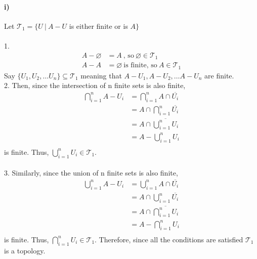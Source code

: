 \documentclass[11pt]{article}
\begin{document}
\paragraph{i)} Let $\mathcal{T}_1 = \{U \ | \ A - U$ is either finite or is $A\}$ \\ \\
1.
\begin{align*}
    A - \varnothing &= A \ \text{, so} \ \varnothing \in \mathcal{T}_1 \\
    A - A &= \varnothing \ \text{is finite, so} \ A \in \mathcal{T}_1
\end{align*}
Say $\{U_1, U_2, \dots U_n\} \subseteq \mathcal{T}_1$ meaning that $A - U_1, A - U_2, \dots A - U_n$ are finite. \\
2. Then, since the intersection of n finite sets is also finite,
\begin{align*}
    \bigcap_{i = 1}^n A - U_i &= \bigcap_{i = 1}^n A \cap \overline{U_i} \\
                              &= A \cap \bigcap_{i = 1}^n \overline{U_i} \\
                              &= A \cap \overline{\bigcup_{i = 1}^n U_i} \\
                              &= A - \bigcup_{i = 1}^n U_i \\
\end{align*}
is finite. Thus, $\bigcup_{i = 1}^n U_i \in \mathcal{T}_1$. \\ \\
3. Similarly, since the union of n finite sets is also finite,
\begin{align*}
    \bigcup_{i = 1}^n A - U_i &= \bigcup_{i = 1}^n A \cap \overline{U_i} \\
                              &= A \cap \bigcup_{i = 1}^n \overline{U_i} \\
                              &= A \cap \overline{\bigcap_{i = 1}^n U_i} \\
                              &= A - \bigcap_{i = 1}^n U_i \\
\end{align*}
is finite. Thus, $\bigcap_{i = 1}^n U_i \in \mathcal{T}_1$. Therefore, since all the conditions are satisfied $\mathcal{T}_1$ is a topology. 

\newpage
\end{document}
